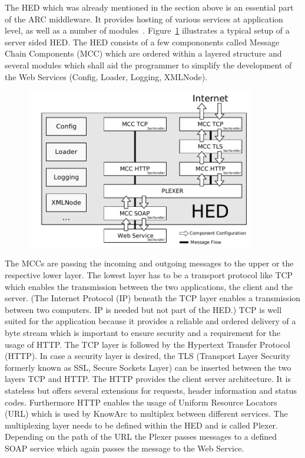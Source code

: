 The HED which was already mentioned in the section above is an essential part of the ARC middleware. It provides hosting of various services at application level, as well as a number of modules~\cite{QIANG_2005}. Figure~\ref{fig:HED_internal} illustrates a typical setup of a server sided HED. The HED consists of a few compononents called Message Chain Components (MCC) which are ordered within a layered structure and several \textcolor{urgent}{modules} which shall aid the programmer to simplify the development of the Web Services (Config, Loader, Logging, XMLNode).
%
\begin{figure}
	\centering
	\includegraphics[width=10cm]{tex_introduction/HED.pdf}
\label{fig:HED_internal}
\end{figure}
The MCCs are passing the incoming and outgoing messages to the upper or the respective lower layer.
The lowest layer has to be a transport protocol like TCP which enables the transmission between the two applications, the client and the server. (The Internet Protocol (IP) beneath the TCP layer enables a transmission between two computers. IP is needed but not part of the HED.) TCP is well suited for the application because it provides a reliable and ordered delivery of a byte stream which is important to ensure security and a requirement for the usage of HTTP.
The TCP layer is followed by the Hypertext Transfer Protocol (HTTP). 
In case a security layer is desired, the TLS (Transport Layer Security formerly known as SSL, Secure Sockets Layer) can be inserted between the two layers TCP and HTTP.
The HTTP provides the client server architecture. It is stateless but offers several extensions for requests, header information and status codes. Furthermore HTTP enables the usage of Uniform Resource Locators (URL) which is used by KnowArc to multiplex between different services. The multiplexing layer needs to be defined within the HED and is called Plexer. Depending on the path of the URL the Plexer passes messages to a defined SOAP service which again passes the message to the Web Service.\\


